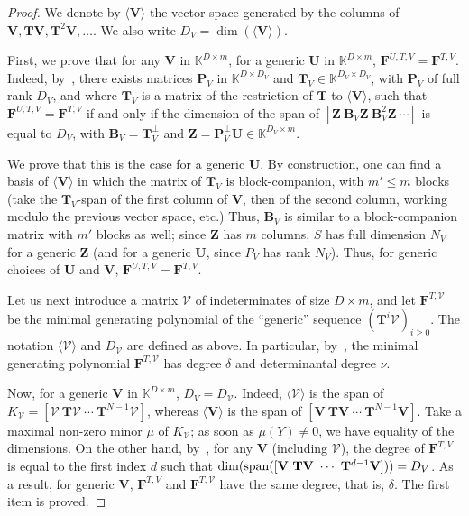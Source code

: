 \documentclass[12pt]{article}
\def\K {\ensuremath{\mathbb{K}}}
\def\scrV {\ensuremath{\mathscr{V}}}
\def\K{\mathbb{K}}
\def\mB{\mathbf{B}}
\def\mF{\mathbf{F}}
\def\mT{\mathbf{T}}
\def\mU{\mathbf{U}}
\def\mV{\mathbf{V}}
\def\mZ{\mathbf{Z}}
\begin{document}
\begin{proof}
	We denote by $\langle \mV \rangle$ the vector
	space generated by the columns of $\mV,\mT\mV,\mT^2\mV,\dots$. We also write
	$D_V=\dim(\langle \mV \rangle)$.
	
	First, we prove that for any $\mV$ in $\K^{D \times m}$, for a generic
	$\mU$ in $\K^{D\times m}$, $\mF^{U,T,V}=\mF^{T,V}$.  Indeed,
	by~\cite[Lemma~4.2]{Villard97a}, there exists matrices $\mathbf{P}_V$ in
	$\K^{D\times D_V}$ and $\mT_V \in \K^{D_V \times D_V}$, with $\mathbf{P}_V$ of
	full rank $D_V$, and where $\mT_V$ is a matrix of the restriction of $\mT$
	to $\langle \mV \rangle$, such that $\mF^{U,T,V}=\mF^{T,V}$ if and only if
	the dimension of the span of $[\mZ ~ \mB_V \mZ ~\mB_V^2 \mZ ~ \cdots]$ is equal to
	$D_V$, with $\mB_V=\mT_V^\perp$ and $\mZ=\mathbf{P}_V^\perp \mU \in \K^{D_V \times m}$.
	
	We prove that this is the case for a generic $\mU$. By construction, one
	can find a basis of $\langle \mV \rangle$ in which the matrix of $\mT_V$
	is block-companion, with $m' \le m$ blocks (take the $\mT_V$-span of the
	first column of $\mV$, then of the second column, working modulo the
	previous vector space, etc.) Thus, $\mB_V$ is similar to a
	block-companion matrix with $m'$ blocks as well; since $\mZ$ has $m$
	columns, $S$ has full dimension $N_V$ for a generic $\mZ$ (and for a
	generic $\mU$, since $P_V$ has rank $N_V$). Thus, for generic choices of
	$\mU$ and $\mV$, $\mF^{U,T,V}=\mF^{T,V}$.
	
	Let us next introduce a matrix $\scrV$ of indeterminates of size $D
	\times m$, and let $\mF^{T,\scrV}$ be the minimal generating polynomial
	of the ``generic'' sequence $(\mT^i \scrV)_{i \ge 0}$. The notation
	$\langle \scrV \rangle$ and $D_\scrV$ are defined as above.  In
	particular, by~\cite[Proposition 6.1]{Villard97a}, the minimal
	generating polynomial $\mF^{T,\scrV}$ has degree $\delta$ and
	determinantal degree $\nu$.
	
	Now, for a generic $\mV$ in $\K^{D\times m}$, $D_V=D_\scrV$. Indeed,
	$\langle \scrV\rangle$ is the span of $K_\scrV=[\scrV ~ \mT \scrV ~ \cdots ~
	\mT^{N-1} \scrV]$, whereas $\langle \mV \rangle$ is the span of $[\mV ~ \mT \mV
	~ \cdots ~\mT^{N-1} \mV]$. Take a maximal non-zero minor $\mu$ of
	$K_\scrV$; as soon as $\mu(Y)\ne 0$, we have equality of the
	dimensions. On the other hand, by~\cite[Lemma~4.3]{Villard97a}, for
	any $\mV$ (including $\scrV$), the degree of $\mF^{T,V}$ is equal to the
	first index $d$ such that $\dim({\rm span}([\mV ~ \mT \mV ~ \cdots ~\mT^{d-1}
	\mV]))=D_V$. As a result, for generic $\mV$, $\mF^{T,V}$ and $\mF^{T,\scrV}$
	have the same degree, that is, $\delta$.  The first item is proved.
	

\end{proof}
\end{document}
